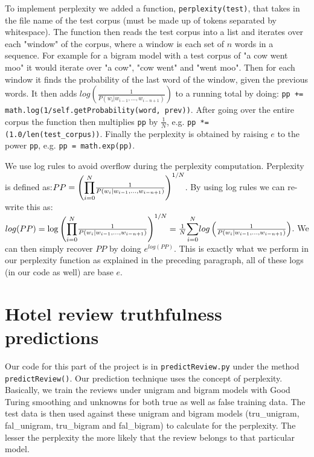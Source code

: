 \documentclass{article}
\begin{document}
To implement perplexity we added a function, \texttt{perplexity(test)}, that takes in the file name of the test corpus (must be made up of tokens separated by whitespace). The function then reads the test corpus into a list and iterates over each "window" of the corpus, where a window is each set of $n$ words in a sequence. For example for a bigram model with a test corpus of "a cow went moo" it would iterate over "a cow", "cow went" and "went moo". Then for each window it finds the probability of the last word of the window, given the previous words. It then adds $log\left(\frac{1}{P(w_i|w_{i-1},...,w_{i-n+1})}\right)$ to a running total by doing: \texttt{pp += math.log(1/self.getProbability(word, prev))}. After going over the entire corpus the function then multiplies \texttt{pp} by $\frac{1}{N}$, e.g. \texttt{pp *= (1.0/len(test\_corpus))}. Finally the perplexity is obtained by raising $e$ to the power \texttt{pp}, e.g. \texttt{pp = math.exp(pp)}.

We use log rules to avoid overflow during the perplexity computation. Perplexity is defined as:\linebreak $PP=\left(\mathlarger{\prod}_{i=0}^N\frac{1}{P(w_i|w_{i-1},...,w_{i-n+1})}\right)^{1/N}$. By using log rules we can re-write this as: \linebreak $log(PP) = \log\left(\mathlarger{\prod}_{i=0}^N\frac{1}{P(w_i|w_{i-1},...,w_{i-n+1})}\right)^{1/N} = \frac{1}{N}\mathlarger{\sum}_{i=0}^N log\left(\frac{1}{P(w_i|w_{i-1},...,w_{i-n+1})}\right)$. We can then simply recover $PP$ by doing $e^{log(PP)}$. This is exactly what we perform in our perplexity function as explained in the preceding paragraph, all of these logs (in our code as well) are base $e$.

\section{Hotel review truthfulness predictions} %
Our code for this part of the project is in \texttt{predictReview.py} under the method \texttt{predictReview()}. Our prediction technique uses the concept of perplexity. Basically, we train the reviews under unigram and bigram models with Good Turing smoothing and unknowns for both true as well as false training data. The test data is then used against these unigram and bigram models (tru\_unigram, fal\_unigram, tru\_bigram and fal\_bigram) to calculate for the perplexity. The lesser the perplexity the more likely that the review belongs to that particular model. \par
\end{document}
